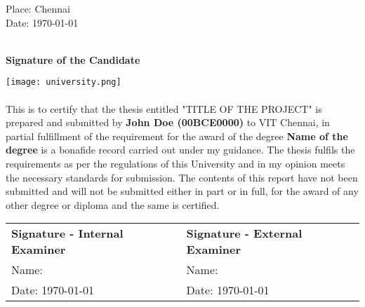 \documentclass{capstone-project}
\newcommand{\projecttitle}{\uppercase{Title of the project}}
\newcommand{\degreename}{Name of the degree}
\newcommand{\authorname}{John Doe}
\newcommand{\regnum}{00BCE0000}
\begin{document}
\vfill
\begin{minipage}[t]{0.5\textwidth}
    Place: Chennai \\
    Date: \today
\end{minipage}
\begin{minipage}[t]{0.5\textwidth}
    ~\\
    \textbf{Signature of the Candidate}
\end{minipage}

\vspace*{3.0in}
\clearpage

\begin{center}
    \vspace*{0.6in}
    \texttt{[image: university.png]}\\
    \vspace{0.6in}
    \vspace{0.3in}
\end{center}

\paragraph{}
This is to certify that the thesis entitled "\projecttitle" is prepared and submitted by \textbf{\authorname \hspace{0.01cm} (\regnum)} to VIT Chennai,
in partial fulfillment of the requirement for the award of the degree \textbf{\degreename} is a bonafide record carried out under my guidance.
The thesis fulfils the requirements as per the regulations of this University and in my opinion meets the necessary standards for submission.
The contents of this report have not been submitted and will not be submitted either in part or in full, for the award of any other degree or
diploma and the same is certified.

\vspace{0.6in}
\begin{table}[h]
    \begin{tabular}{ll}
        \textbf{Signature - Internal Examiner} & \textbf{Signature - External Examiner} \\
        Name:                                  & Name:                                  \\
        Date: \today                           & Date: \today                           \\
    \end{tabular}
\end{table}
\end{document}
